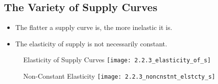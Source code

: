\subsection{The Variety of Supply Curves}

\begin{itemize}

\item The flatter a supply curve is, the more inelastic it is. 

\item The elasticity of supply is not necessarily constant.

\end{itemize}

\begin{figure}[ht]
Elasticity of Supply Curves
\centering
\texttt{[image: 2.2.3\_elasticity\_of\_s]}
\end{figure}

\begin{figure}[ht]
Non-Constant Elasticity
\centering
\texttt{[image: 2.2.3\_noncnstnt\_elstcty\_s]}
\end{figure}

\newpage
